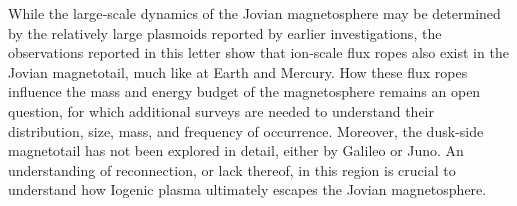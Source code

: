 While the large‐scale dynamics of the Jovian magnetosphere may be determined by the relatively large plasmoids reported by earlier investigations, the observations reported in this letter show that ion‐scale flux ropes also exist in the Jovian magnetotail, much like at Earth and Mercury. How these flux ropes influence the mass and energy budget of the magnetosphere remains an open question, for which additional surveys are needed to understand their distribution, size, mass, and frequency of occurrence. Moreover, the dusk‐side magnetotail has not been explored in detail, either by Galileo or Juno. An understanding of reconnection, or lack thereof, in this region is crucial to understand how Iogenic plasma ultimately escapes the Jovian magnetosphere.
